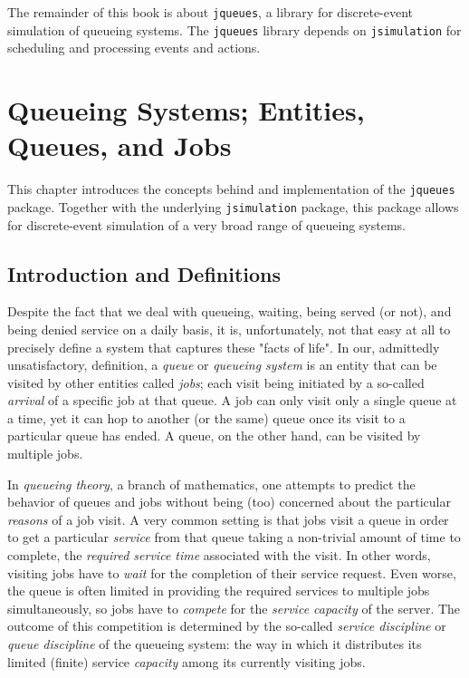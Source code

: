 \documentclass[12pt]{book}
\begin{document}
The remainder of this book is about \lstinline|jqueues|,
  a library for discrete-event simulation of queueing systems.
The \lstinline|jqueues| library depends on \lstinline|jsimulation|
  for scheduling and processing events and actions.

\chapter{Queueing Systems; Entities, Queues, and Jobs}

This chapter introduces the concepts behind and implementation of the
  \lstinline|jqueues| package.
Together with the underlying \lstinline|jsimulation| package,
  this package allows for discrete-event simulation of
  a very broad range of queueing systems.

\section{Introduction and Definitions}

Despite the fact that we deal with queueing, waiting, being served (or not),
  and being denied service on a daily basis,
  it is,
  unfortunately,
  not that easy at all to precisely define a system
  that captures these "facts of life".
In our, admittedly unsatisfactory, definition,
  a {\em queue\/} or {\em queueing system\/} is an entity
  that can be visited
  by other entities called {\em jobs};
  each visit being initiated by a so-called {\em arrival\/} of a specific job
  at that queue.
A job can only visit only a single queue at a time,
  yet it can hop to another (or the same) queue
  once its visit to a particular queue has ended.
A queue, on the other hand,
  can be visited by multiple jobs.

In {\em queueing theory},
  a branch of mathematics,
  one attempts to predict the behavior of queues and jobs
  without being (too) concerned about the particular {\em reasons\/} of a job visit.
A very common setting is that jobs visit a queue in order to
  get a particular {\em service\/}
  from that queue
  taking a non-trivial amount of time to complete,
  the {\em required service time\/}
  associated with the visit.
In other words,
  visiting jobs have to {\em wait\/} for the completion of their service request.
Even worse,
  the queue is often limited in providing the required services
  to multiple jobs simultaneously,
  so jobs have to {\em compete\/}
  for the {\em service capacity} of the server.
The outcome of this competition is determined by the so-called
  {\em service discipline\/} or {\em queue discipline\/}
  of the queueing system:
  the way in which it distributes its limited (finite)
  service {\em capacity\/} among its currently visiting jobs.
\end{document}
